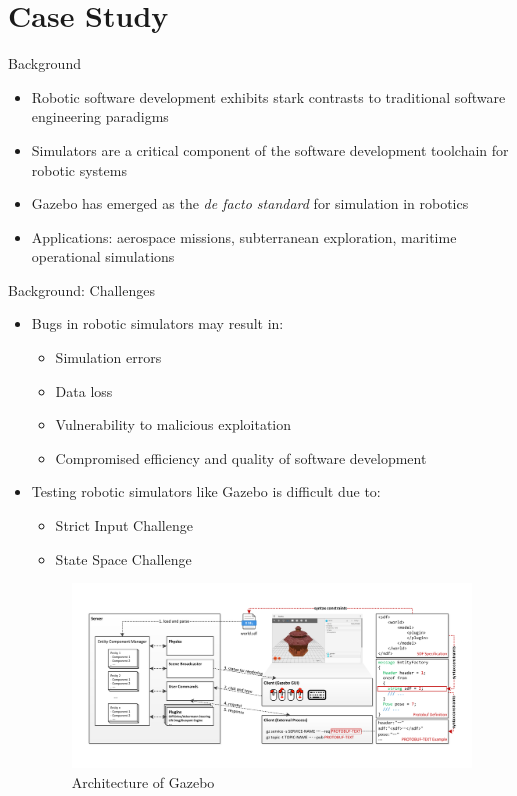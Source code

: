 \documentclass{beamer}
\begin{document}
\section{Case Study}
\begin{frame}{Background}
\begin{itemize}
\item Robotic software development exhibits stark contrasts to traditional software engineering paradigms
\item Simulators are a critical component of the software development toolchain for robotic systems
\item Gazebo has emerged as the \textit{de facto standard} for simulation in robotics
\item Applications: aerospace missions, subterranean exploration, maritime operational simulations
\end{itemize}
\end{frame}

\begin{frame}{Background: Challenges}
\begin{itemize}
\item Bugs in robotic simulators may result in:
  \begin{itemize}
  \item Simulation errors
  \item Data loss
  \item Vulnerability to malicious exploitation
  \item Compromised efficiency and quality of software development
  \end{itemize}
\item Testing robotic simulators like Gazebo is difficult due to:
  \begin{itemize}
  \item Strict Input Challenge
  \item State Space Challenge
  \end{itemize}
  \begin{figure}
  \begin{center}
      \includegraphics[width=.6\textwidth]{images/architecture.pdf}
  \end{center}
  \caption{Architecture of Gazebo}
  \label{fig:}
  \end{figure}
  
\end{itemize}
\end{frame}
\end{document}
